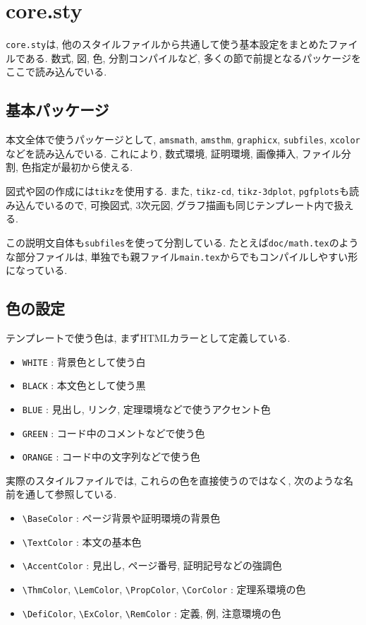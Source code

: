 \documentclass[../main.tex]{subfiles}
\begin{document}
\section{core.sty}

\texttt{core.sty}は, 他のスタイルファイルから共通して使う基本設定をまとめたファイルである. 
数式, 図, 色, 分割コンパイルなど, 多くの節で前提となるパッケージをここで読み込んでいる. 

\subsection{基本パッケージ}

本文全体で使うパッケージとして, \texttt{amsmath}, \texttt{amsthm}, \texttt{graphicx}, \texttt{subfiles}, \texttt{xcolor}などを読み込んでいる. 
これにより, 数式環境, 証明環境, 画像挿入, ファイル分割, 色指定が最初から使える. 

図式や図の作成には\texttt{tikz}を使用する. 
また, \texttt{tikz-cd}, \texttt{tikz-3dplot}, \texttt{pgfplots}も読み込んでいるので, 可換図式, 3次元図, グラフ描画も同じテンプレート内で扱える. 

この説明文自体も\texttt{subfiles}を使って分割している. 
たとえば\texttt{doc/math.tex}のような部分ファイルは, 単独でも親ファイル\texttt{main.tex}からでもコンパイルしやすい形になっている. 

\subsection{色の設定}

テンプレートで使う色は, まずHTMLカラーとして定義している. 
\begin{itemize}
	\item \verb|WHITE| : 背景色として使う白
	\item \verb|BLACK| : 本文色として使う黒
	\item \verb|BLUE| : 見出し, リンク, 定理環境などで使うアクセント色
	\item \verb|GREEN| : コード中のコメントなどで使う色
	\item \verb|ORANGE| : コード中の文字列などで使う色
\end{itemize}

実際のスタイルファイルでは, これらの色を直接使うのではなく, 次のような名前を通して参照している. 
\begin{itemize}
	\item \verb|\BaseColor| : ページ背景や証明環境の背景色
	\item \verb|\TextColor| : 本文の基本色
	\item \verb|\AccentColor| : 見出し, ページ番号, 証明記号などの強調色
	\item \verb|\ThmColor|, \verb|\LemColor|, \verb|\PropColor|, \verb|\CorColor| : 定理系環境の色
	\item \verb|\DefiColor|, \verb|\ExColor|, \verb|\RemColor| : 定義, 例, 注意環境の色
\end{itemize}
\end{document}
